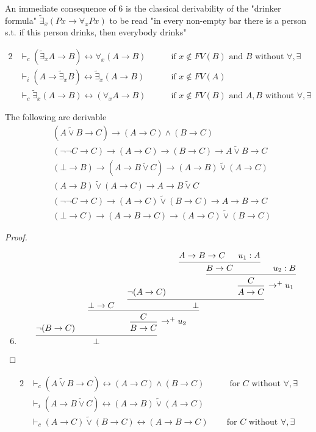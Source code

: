 \documentclass[11pt]{article}
\def \texists {\tilde{\exists}}
\def \tvee {\tilde{\vee}}
\begin{document}
An immediate consequence of 6 is the classical derivability of the "drinker
formula" \(\texists_x(Px\to\forall_xPx)\) to be read "in every non-empty bar
there is a person s.t. if this person drinks, then everybody drinks"

\begin{corollary}[]
\begin{alignat*}{2}
&\vdash_c(\texists_xA\to B)\leftrightarrow\forall_x(A\to B)\quad
&&\text{ if }x\not\in FV(B)\text{ and }B\text{ without }\forall,\exists\\
&\vdash_i(A\to\texists_xB)\leftrightarrow\texists_x(A\to B)
&&\text{ if }x\not\in FV(A)\\
&\vdash_c\texists_x(A\to B)\leftrightarrow(\forall_xA\to B)\quad
&&\text{ if }x\not\in FV(B)\text{ and }A,B\text{ without }\forall,\exists
\end{alignat*}
\end{corollary}

\begin{lemma}[]
The following are derivable
\begin{align*}
&(A\tvee B\to C)\to (A\to C)\wedge(B\to C)\\
&(\neg\neg C\to C)\to(A\to C)\to(B\to C)\to A\tvee B\to C\\
&(\bot\to B)\to(A\to B \tvee C)\to(A\to B)\tvee(A\to C)\\
&(A\to B)\tvee(A\to C)\to A\to B\tvee C\\
&(\neg\neg C\to C)\to(A\to C)\tvee(B\to C)\to A\to B\to C\\
&(\bot\to C)\to(A\to B\to C)\to(A\to C)\tvee(B\to C)
\end{align*}
\end{lemma}

\begin{proof}
\begin{enumerate}
\setcounter{enumi}{5}
\item \begin{equation*}
\begin{prooftree}[center=false]
\hypo{\neg(B\to C)}
\hypo{\bot\to C}
\hypo{\neg(A\to C)}
\hypo{A\to B\to C}
\hypo{u_1:A}
\infer2{B\to C}
\hypo{u_2:B}
\infer2{C}
\infer1[\(\to^+u_1\)]{A\to C}
\infer2{\bot}
\infer2{C}
\infer1[\(\to^+u_2\)]{B\to C}
\infer2{\bot}
\end{prooftree}
\end{equation*}
\end{enumerate}
\end{proof}

\begin{corollary}[]
\begin{alignat*}{2}
&\vdash_c(A\tvee B\to C)\leftrightarrow(A\to C)\wedge(B\to C)\quad&&\text{ for }C
\text{ without }\forall,\exists\\
&\vdash_i(A\to B\tvee C)\leftrightarrow(A\to B)\tvee(A\to C)\\
&\vdash_c(A\to C)\tvee(B\to C)\leftrightarrow(A\to B\to C)
&&\text{for }C\text{ without }\forall,\exists
\end{alignat*}
\end{corollary}
\end{document}
